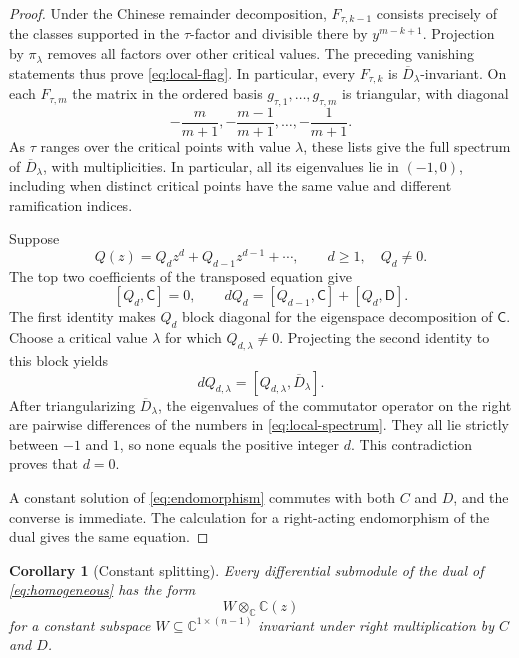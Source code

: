 \documentclass[11pt]{article}
\numberwithin{equation}{section}
\newtheorem{corollary}[corollary]{Corollary}
\theoremstyle{definition}
\theoremstyle{remark}
\newcommand{\C}{\mathbb C}
\begin{document}
\begin{proof}
Under the Chinese remainder decomposition, $F_{\tau,k-1}$ consists
precisely of the classes supported in the $\tau$-factor and divisible
there by $y^{m-k+1}$.  Projection by $\pi_\lambda$ removes all factors
over other critical values.  The preceding vanishing statements thus
prove \eqref{eq:local-flag}.  In particular, every $F_{\tau,k}$ is
$\overline D_\lambda$-invariant.  On each $F_{\tau,m}$ the matrix in the
ordered basis $g_{\tau,1},\ldots,g_{\tau,m}$ is triangular, with diagonal
\begin{equation}\label{eq:local-spectrum}
  -\frac{m}{m+1},
  -\frac{m-1}{m+1},\ldots,-\frac1{m+1}.
\end{equation}
As $\tau$ ranges over the critical points with value $\lambda$, these
lists give the full spectrum of $\overline D_\lambda$, with
multiplicities.  In particular, all its eigenvalues lie in $(-1,0)$,
including when distinct critical points have the same value and different
ramification indices.

Suppose
\[
  Q(z)=Q_dz^d+Q_{d-1}z^{d-1}+\cdots,
  \qquad d\ge1,\quad Q_d\ne0.
\]
The top two coefficients of the transposed equation give
\begin{equation}\label{eq:top-coefficients}
  [Q_d,\mathsf C]=0,
  \qquad
  dQ_d=[Q_{d-1},\mathsf C]+[Q_d,\mathsf D].
\end{equation}
The first identity makes $Q_d$ block diagonal for the eigenspace
decomposition of $\mathsf C$.  Choose a critical value $\lambda$ for
which $Q_{d,\lambda}\ne0$.
Projecting the second identity to this block yields
\[
  dQ_{d,\lambda}
  =[Q_{d,\lambda},\overline D_\lambda].
\]
After triangularizing $\overline D_\lambda$, the eigenvalues of the
commutator operator on the right are pairwise differences of the numbers in
\eqref{eq:local-spectrum}.  They all lie strictly between $-1$ and $1$,
so none equals the positive integer $d$.  This contradiction proves that
$d=0$.

A constant solution of \eqref{eq:endomorphism} commutes with both $C$ and
$D$, and the converse is immediate.  The calculation for a right-acting
endomorphism of the dual gives the same equation.
\end{proof}

\begin{corollary}[Constant splitting]\label{cor:constant-splitting}
Every differential submodule of the dual of \eqref{eq:homogeneous} has the
form
\[
  W\otimes_\C\C(z)
\]
for a constant subspace $W\subseteq\C^{1\times(n-1)}$ invariant under
right multiplication by $C$ and $D$.
\end{corollary}
\end{document}
